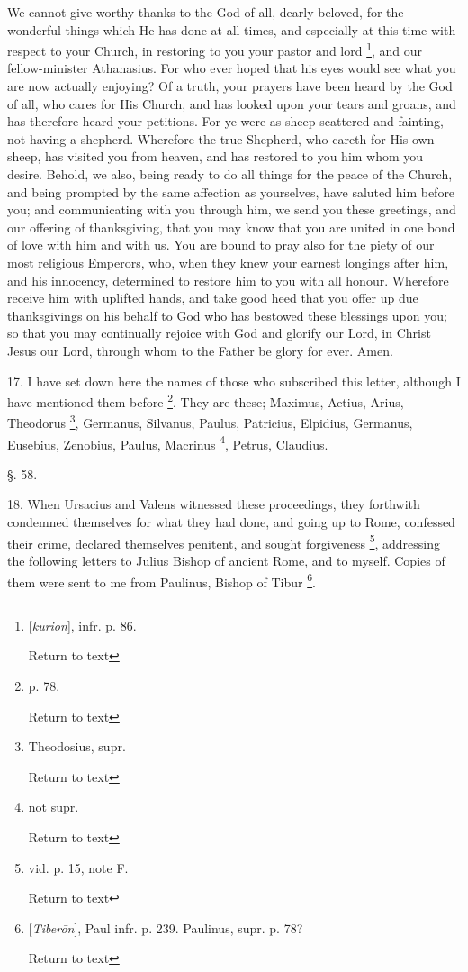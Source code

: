 We cannot give worthy thanks to the God of all,
dearly beloved, for the wonderful things which He has done at all
times, and especially at this time with respect to your Church, in
restoring to you your pastor and lord \footnote{[\emph{kurion}], infr. p. 86.

Return to text}, and our fellow-minister Athanasius. For who ever hoped that
his eyes would see what you are now actually enjoying? Of a truth,
your prayers have been heard by the God of all, who cares for His
Church, and has looked upon your tears and groans, and has therefore
heard your petitions. For ye were as sheep scattered and fainting, not
having a shepherd. Wherefore the true Shepherd, who careth for His own
sheep, has visited you from heaven, and has restored to you him whom
you desire. Behold, we also, being ready to do all things for the
peace of the Church, and being prompted by the same affection as
yourselves, have saluted him before you; and communicating with you
through him, we send you these greetings, and our offering of
thanksgiving, that you may know that you are united in one bond of
love with him and with us. You are bound to pray also for the piety of
our most religious Emperors, who, when they knew your earnest longings
after him, and his innocency, determined to restore him to you with
all honour. Wherefore receive him with uplifted hands, and take good
heed that you offer up due thanksgivings on his behalf to God who has
bestowed these blessings upon you; so that you may continually rejoice
with God and glorify our Lord, in Christ Jesus our Lord, through
whom to the Father be glory for ever. Amen.

17. I have set down here the names of those who
subscribed this letter, although I have mentioned them before \footnote{p. 78.

Return to text}. They are these; Maximus, Aetius, Arius, Theodorus \footnote{Theodosius, supr.

Return to text}, Germanus, Silvanus, Paulus, Patricius, Elpidius, Germanus,
Eusebius, Zenobius, Paulus, Macrinus \footnote{not supr.

Return to text}, Petrus, Claudius.

§. 58.

18. When Ursacius and Valens witnessed these
proceedings, they forthwith condemned themselves for what they had
done, and going up to Rome, confessed their crime, declared themselves
penitent, and sought forgiveness \footnote{vid. p. 15, note F.

Return to text}, addressing the following letters to Julius Bishop of ancient
Rome, and to myself. Copies of them were sent to me from Paulinus,
Bishop of Tibur \footnote{[\emph{Tiber\={o}n}], Paul infr. p. 239. Paulinus, supr. p. 78?

Return to text}.

